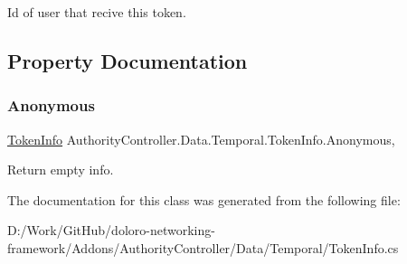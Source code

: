 Id of user that recive this token. 



\subsection{Property Documentation}
\mbox{\label{class_authority_controller_1_1_data_1_1_temporal_1_1_token_info_acab070b9dcca472286bc953501989df0}} 
\subsubsection{\texorpdfstring{Anonymous}{Anonymous}}
{\footnotesize\ttfamily \mbox{\hyperlink{class_authority_controller_1_1_data_1_1_temporal_1_1_token_info}{Token\+Info}} Authority\+Controller.\+Data.\+Temporal.\+Token\+Info.\+Anonymous\hspace{0.3cm}{\ttfamily [static]}, {\ttfamily [get]}}



Return empty info. 



The documentation for this class was generated from the following file\+:\begin{DoxyCompactItemize}
\item 
D\+:/\+Work/\+Git\+Hub/doloro-\/networking-\/framework/\+Addons/\+Authority\+Controller/\+Data/\+Temporal/Token\+Info.\+cs\end{DoxyCompactItemize}
